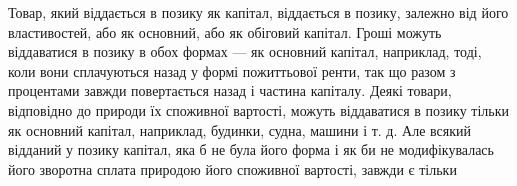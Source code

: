 Товар, який віддається в позику як капітал, віддається в позику,
залежно від його властивостей, або як основний, або як
обіговий капітал. Гроші можуть віддаватися в позику в обох
формах — як основний капітал, наприклад, тоді, коли вони сплачуються
назад у формі пожиттьової ренти, так що разом з процентами
завжди повертається назад і частина капіталу. Деякі
товари, відповідно до природи їх споживної вартості, можуть
віддаватися в позику тільки як основний капітал, наприклад,
будинки, судна, машини і т. д. Але всякий відданий у позику капітал,
яка б не була його форма і як би не модифікувалась його зворотна
сплата природою його споживної вартості, завжди є тільки
\parbreak{}  %
